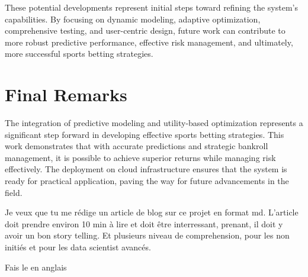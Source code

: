 These potential developments represent initial steps toward refining the system's capabilities. By focusing on dynamic modeling, adaptive optimization, comprehensive testing, and user-centric design, future work can contribute to more robust predictive performance, effective risk management, and ultimately, more successful sports betting strategies.

\section{Final Remarks}

The integration of predictive modeling and utility-based optimization represents a significant step forward in developing effective sports betting strategies. This work demonstrates that with accurate predictions and strategic bankroll management, it is possible to achieve superior returns while managing risk effectively. The deployment on cloud infrastructure ensures that the system is ready for practical application, paving the way for future advancements in the field.


Je veux que tu me rédige un article de blog sur ce projet en format md. L'article doit prendre environ 10 min à lire et doit être interressant, prenant, il doit y avoir un bon story telling. Et plusieurs niveau de comprehension, pour les non initiés et pour les data scientist avancés.

Fais le en anglais
